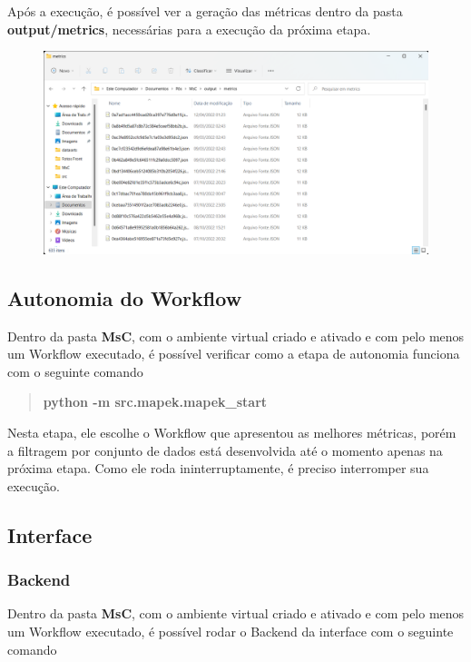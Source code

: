 \documentclass[portugues]{ic-tese}
\begin{document}
Após a execução, é possível ver a geração das métricas dentro da pasta \textbf{output/metrics}, necessárias para a execução da próxima etapa.

\begin{figure}[H]
\centering
\includegraphics[scale=0.25]{images/doc-install/metrics.png}
\label{fig:DocInstallMetrics}
\end{figure}

\subsection{Autonomia do Workflow}

Dentro da pasta \textbf{MsC}, com o ambiente virtual criado e ativado e com pelo menos um Workflow executado, é possível verificar como a etapa de autonomia funciona com o seguinte comando

\begin{quote}\textbf{python -m src.mapek.mapek\_start}\end{quote}

Nesta etapa, ele escolhe o Workflow que apresentou as melhores métricas, porém a filtragem por conjunto de dados está desenvolvida até o momento apenas na próxima etapa. Como ele roda ininterruptamente, é preciso interromper sua execução.

\subsection{Interface}

\subsubsection{Backend}

Dentro da pasta \textbf{MsC}, com o ambiente virtual criado e ativado e com pelo menos um Workflow executado, é possível rodar o Backend da interface com o seguinte comando
\end{document}
